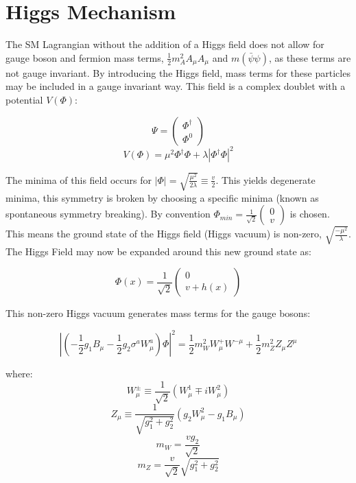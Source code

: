 \section{Higgs Mechanism}
The SM Lagrangian without the addition of a Higgs field does not allow for gauge boson and fermion mass terms, $\frac{1}{2}m_{A}^{2}A_{\mu}A_{\mu}$ and $m(\bar{\psi}\psi)$,  as these terms are not gauge invariant. By introducing the Higgs field, mass terms for these particles may be included in a gauge invariant way. This field is a complex doublet with a potential $V(\Phi)$:

\begin{equation}
\Psi = \begin{pmatrix} \Phi^{\dagger} \\ \Phi^{0} \end{pmatrix}
\end{equation}
\begin{equation}
V(\Phi)=\mu^{2}\Phi^{\dagger}\Phi + \lambda |\Phi^{\dagger}\Phi|^{2}
\end{equation}

The minima of this field occurs for $|\Phi|= \sqrt{\frac{\mu^{2}}{2\lambda}} \equiv \frac{v}{2}$. This yields degenerate minima, this symmetry is broken by choosing a specific minima (known as spontaneous symmetry breaking). By convention  $\Phi_{min} = \frac{1}{\sqrt{2}}\begin{pmatrix}0 \\ v \end{pmatrix}$ is chosen. This means the ground state of the Higgs field (Higgs vacuum) is non-zero, $\sqrt{\frac{-\mu^{2}}{\lambda}}$. The Higgs Field may now be expanded around this new ground state as:

\begin{equation}
\Phi(x)=\frac{1}{\sqrt{2}}\begin{pmatrix} 0 \\ v+h(x)\end{pmatrix}
\end{equation}

This non-zero Higgs vacuum generates mass terms for the gauge bosons:

\begin{equation}
|(-\frac{1}{2}g_{1}B_{\mu}-\frac{1}{2}g_{2}\sigma^{a}W_{\mu}^{a})\Phi|^{2}=\frac{1}{2}m_{W}^{2}W_{\mu}^{+}W^{-\mu}+\frac{1}{2}m_{Z}^{2}Z_{\mu}Z^{\mu}
\end{equation}

where:
\begin{equation}
W^{\pm}_{\mu} \equiv \frac{1}{\sqrt{2}}(W^{1}_{\mu} \mp iW^{2}_{\mu})
\end{equation}
\begin{equation}
Z_{\mu} \equiv \frac{1}{\sqrt{g_{1}^{2}+g_{2}^{2}}}(g_{2}W^{2}_{\mu}-g_{1}B_{\mu})
\end{equation}
\begin{equation}
m_{W} = \frac{vg_{2}}{\sqrt{2}}
\end{equation}
\begin{equation}
m_{Z} = \frac{v}{\sqrt{2}}\sqrt{g_{1}^{2} + g_{2}^{2}}
\end{equation}

